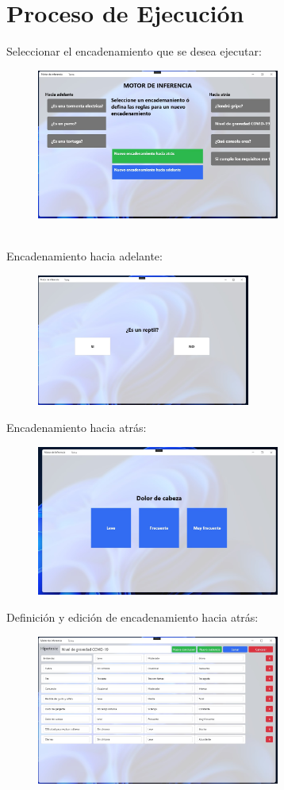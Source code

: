\documentclass[conference]{IEEEtran}
\begin{document}
\section{Proceso de Ejecución}
Seleccionar el encadenamiento que se desea ejecutar:
\\
\begin{figure}[h!]
    \includegraphics[width=8cm]{principal.jpg}
\end{figure}
\\
Encadenamiento hacia adelante:
\begin{figure}[h!]
    \includegraphics[width=7cm]{ejecucionadelante.jpg}
\end{figure}
\newpage
Encadenamiento hacia atrás:
\begin{figure}[h!]
    \includegraphics[width=8cm]{ejecucionatras.jpg}
\end{figure}
Definición y edición de encadenamiento hacia atrás:
\begin{figure}[h!]
    \includegraphics[width=8cm]{hacia_atrasjpg.jpg}
\end{figure}
\end{document}
